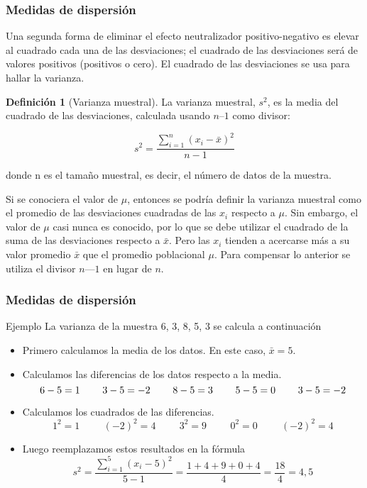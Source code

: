 \documentclass[10pt]{beamer}
\theoremstyle{plain} %
\theoremstyle{definition}
\newtheorem{defn}{Definición}
\theoremstyle{remark}
\begin{document}
\begin{frame}
\frametitle{Medidas de dispersión}
Una segunda forma de eliminar el efecto neutralizador positivo-negativo es elevar al cuadrado cada una de las desviaciones; el cuadrado de las desviaciones será de valores positivos (positivos o cero). El cuadrado de las desviaciones se usa para hallar la varianza.
\begin{defn}[Varianza muestral]
La varianza muestral, $s^2$, es la media del cuadrado de las desviaciones, calculada usando $n – 1$ como divisor:

$$s^2=\frac{\sum_{i=1}^n(x_i-\bar{x})^2}{n-1}$$

donde n es el tamaño muestral, es decir, el número de datos de la muestra.
\end{defn}

Si se conociera el valor de $\mu$, entonces se podría definir la varianza muestral como el promedio de las desviaciones cuadradas de las $x_i$ respecto a $\mu$. Sin embargo, el valor de $\mu$ casi nunca es conocido, por lo que se debe utilizar el cuadrado de la suma de las desviaciones respecto a $\bar{x}$. Pero las $x_i$ tienden a acercarse más a su valor promedio $\bar{x}$ que el promedio poblacional $\mu$. Para compensar lo anterior se utiliza el divisor $n — 1$ en lugar de $n$.

\end{frame}

\begin{frame}
\frametitle{Medidas de dispersión}
\begin{exampleblock}{Ejemplo}
La varianza de la muestra 6, 3, 8, 5, 3 se calcula a continuación
\begin{itemize}
\item Primero calculamos la media de los datos. En este caso, $\bar{x}=5$.
\item Calculamos las diferencias de los datos respecto a la media.
$$6-5=1\hspace{0.8cm} 3-5=-2\hspace{0.8cm} 8-5=3\hspace{0.8cm} 5-5=0\hspace{0.8cm} 3-5=-2$$
\item Calculamos los cuadrados de las diferencias.
$$1^2=1\hspace{1cm} (-2)^2=4\hspace{1cm} 3^2=9\hspace{1cm} 0^2=0\hspace{1cm} (-2)^2=4$$
\item Luego reemplazamos estos resultados en la fórmula
$$s^2=\frac{\sum_{i=1}^5 (x_i-5)^2}{5-1}=\frac{1+4+9+0+4}{4}=\frac{18}{4}=4{,}5$$
\end{itemize}
\end{exampleblock}
\end{frame}
\end{document}
